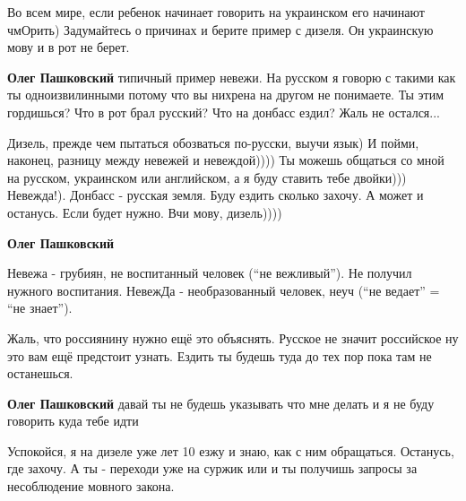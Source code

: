 \begin{itemize}

Во всем мире, если ребенок начинает говорить на украинском его начинают чмОрить) Задумайтесь о причинах и берите пример с дизеля. Он украинскую мову и в рот не берет.


\textbf{Олег Пашковский} типичный пример невежи. На русском я говорю с такими как ты одноизвилинными потому что вы нихрена на другом не понимаете. Ты этим гордишься? Что в рот брал русский? Что на донбасс ездил? Жаль не остался...


Дизель, прежде чем пытаться обозваться по-русски, выучи язык) И пойми,
наконец, разницу между невежей и невеждой)))) Ты можешь общаться со мной на
русском, украинском или английском, а я буду ставить тебе двойки))) Невежда!).
Донбасс - русская земля. Буду ездить сколько захочу. А может и останусь. Если
будет нужно. Вчи мову, дизель))))


\textbf{Олег Пашковский} 

Невежа - грубиян, не воспитанный человек (\enquote{не вежливый}). Не получил нужного
воспитания. НевежДа - необразованный человек, неуч (\enquote{не ведает} = \enquote{не знает}).

Жаль, что россиянину нужно ещё это объяснять. Русское не значит российское ну
это вам ещё предстоит узнать. Ездить ты будешь туда до тех пор пока там не
останешься.


\textbf{Олег Пашковский} давай ты не будешь указывать что мне делать и я не буду говорить куда тебе идти


Успокойся, я на дизеле уже лет 10 езжу и знаю, как с ним обращаться. Останусь,
где захочу. А ты - переходи уже на суржик или и ты получишь запросы за
несоблюдение мовного закона.


\end{itemize}
